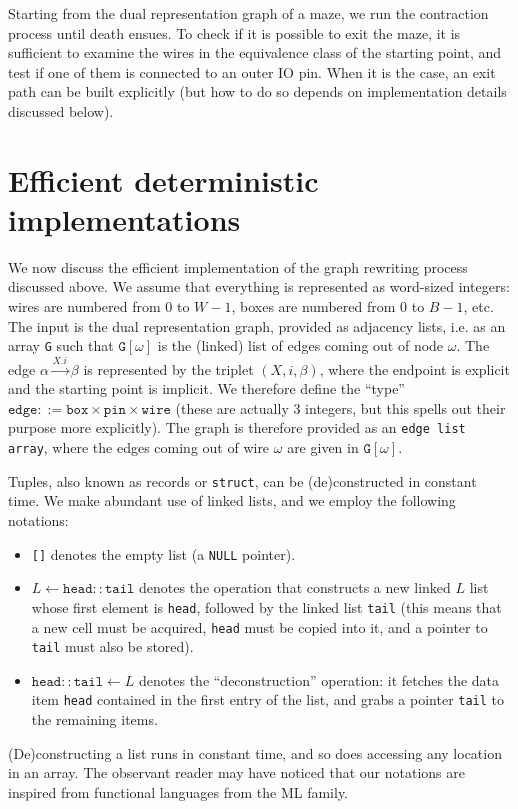 \documentclass[a4paper,UKenglish,cleveref, autoref]{lipics-v2021}
\begin{document}
Starting from the dual representation graph of a maze, we run the contraction
process until death ensues. To check if it is possible to exit the maze, it is
sufficient to examine the wires in the equivalence class of the starting point,
and test if one of them is connected to an outer IO pin. When it is the case, an
exit path can be built explicitly (but how to do so depends on implementation
details discussed below).

\section{Efficient deterministic implementations}
\label{sec:implem}

We now discuss the efficient implementation of the graph rewriting process
discussed above. We assume that everything is represented as word-sized
integers: wires are numbered from 0 to $W-1$, boxes are numbered from 0 to
$B-1$, etc. The input is the dual representation graph, provided as adjacency
lists, i.e. as an array \texttt{G} such that $\texttt{G}[\omega]$ is the
(linked) list of edges coming out of node $\omega$. The edge
$\alpha \xrightarrow{X.i} \beta$ is represented by the triplet $(X, i, \beta)$,
where the endpoint is explicit and the starting point is implicit. We therefore
define the ``type''
$\texttt{edge} ::= \texttt{box} \times \texttt{pin} \times \texttt{wire}$ (these
are actually 3 integers, but this spells out their purpose more explicitly). The
graph is therefore provided as an \texttt{edge list array}, where the edges
coming out of wire $\omega$ are given in $\texttt{G}[\omega]$.

Tuples, also known as records or \texttt{struct}, can be (de)constructed in
constant time. We make abundant use of linked lists, and we
employ the following notations:
\begin{itemize}
\item \texttt{[]} denotes the empty list (a \texttt{NULL} pointer).
\item $L \gets \texttt{head} :: \texttt{tail}$ denotes the operation that constructs a
  new linked $L$ list whose first element is \texttt{head}, followed by the linked
  list \texttt{tail} (this means that a new cell must be acquired, \texttt{head}
  must be copied into it, and a pointer to \texttt{tail} must also be stored).
\item $\texttt{head} :: \texttt{tail} \gets L$ denotes the ``deconstruction''
  operation: it fetches the data item \texttt{head} contained in the first entry
  of the list, and grabs a pointer \texttt{tail} to the remaining items.
\end{itemize}
(De)constructing a list runs in constant time, and so does accessing any
location in an array. The observant reader may have noticed that our notations
are inspired from functional languages from the ML family.
\end{document}
